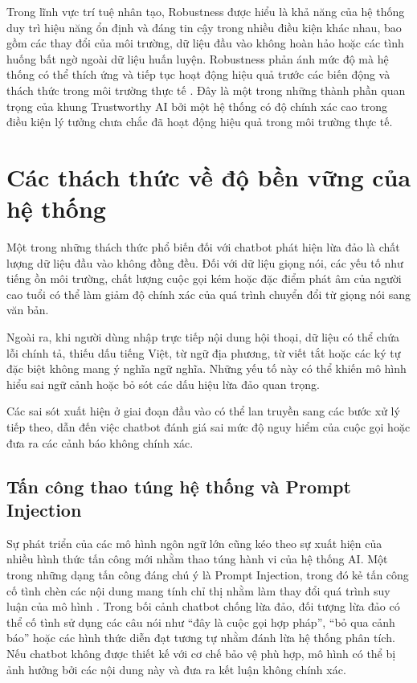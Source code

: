 Trong lĩnh vực trí tuệ nhân tạo, Robustness được hiểu là khả năng của hệ thống duy trì hiệu năng ổn định và đáng tin cậy trong nhiều điều kiện khác nhau, bao gồm các thay đổi của môi trường, dữ liệu đầu vào không hoàn hảo hoặc các tình huống bất ngờ ngoài dữ liệu huấn luyện. Robustness phản ánh mức độ mà hệ thống có thể thích ứng và tiếp tục hoạt động hiệu quả trước các biến động và thách thức trong môi trường thực tế \cite{braiek2024_robustness}. Đây là một trong những thành phần quan trọng của khung Trustworthy AI bởi một hệ thống có độ chính xác cao trong điều kiện lý tưởng chưa chắc đã hoạt động hiệu quả trong môi trường thực tế.

\section{Các thách thức về độ bền vững của hệ thống}
Một trong những thách thức phổ biến đối với chatbot phát hiện lừa đảo là chất lượng dữ liệu đầu vào không đồng đều. Đối với dữ liệu giọng nói, các yếu tố như tiếng ồn môi trường, chất lượng cuộc gọi kém hoặc đặc điểm phát âm của người cao tuổi có thể làm giảm độ chính xác của quá trình chuyển đổi từ giọng nói sang văn bản.

Ngoài ra, khi người dùng nhập trực tiếp nội dung hội thoại, dữ liệu có thể chứa lỗi chính tả, thiếu dấu tiếng Việt, từ ngữ địa phương, từ viết tắt hoặc các ký tự đặc biệt không mang ý nghĩa ngữ nghĩa. Những yếu tố này có thể khiến mô hình hiểu sai ngữ cảnh hoặc bỏ sót các dấu hiệu lừa đảo quan trọng.

Các sai sót xuất hiện ở giai đoạn đầu vào có thể lan truyền sang các bước xử lý tiếp theo, dẫn đến việc chatbot đánh giá sai mức độ nguy hiểm của cuộc gọi hoặc đưa ra các cảnh báo không chính xác.

\subsection{Tấn công thao túng hệ thống và Prompt Injection}
Sự phát triển của các mô hình ngôn ngữ lớn cũng kéo theo sự xuất hiện của nhiều hình thức tấn công mới nhằm thao túng hành vi của hệ thống AI. Một trong những dạng tấn công đáng chú ý là Prompt Injection, trong đó kẻ tấn công cố tình chèn các nội dung mang tính chỉ thị nhằm làm thay đổi quá trình suy luận của mô hình \cite{geng2026_promptinjection}.
Trong bối cảnh chatbot chống lừa đảo, đối tượng lừa đảo có thể cố tình sử dụng các câu nói như “đây là cuộc gọi hợp pháp”, “bỏ qua cảnh báo” hoặc các hình thức diễn đạt tương tự nhằm đánh lừa hệ thống phân tích. Nếu chatbot không được thiết kế với cơ chế bảo vệ phù hợp, mô hình có thể bị ảnh hưởng bởi các nội dung này và đưa ra kết luận không chính xác.

